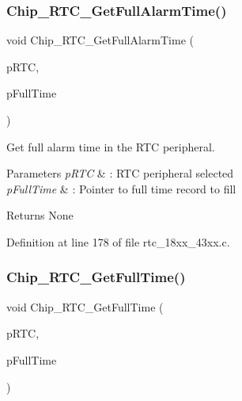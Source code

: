 \subsubsection{\texorpdfstring{Chip\+\_\+\+R\+T\+C\+\_\+\+Get\+Full\+Alarm\+Time()}{Chip\_RTC\_GetFullAlarmTime()}}
{\footnotesize\ttfamily void Chip\+\_\+\+R\+T\+C\+\_\+\+Get\+Full\+Alarm\+Time (\begin{DoxyParamCaption}\item[{\hyperlink{struct_l_p_c___r_t_c___t}{L\+P\+C\+\_\+\+R\+T\+C\+\_\+T} $\ast$}]{p\+R\+TC,  }\item[{\hyperlink{struct_r_t_c___t_i_m_e___t}{R\+T\+C\+\_\+\+T\+I\+M\+E\+\_\+T} $\ast$}]{p\+Full\+Time }\end{DoxyParamCaption})}



Get full alarm time in the R\+TC peripheral. 


\begin{DoxyParams}{Parameters}
{\em p\+R\+TC} & \+: R\+TC peripheral selected \\
\hline
{\em p\+Full\+Time} & \+: Pointer to full time record to fill \\
\hline
\end{DoxyParams}
\begin{DoxyReturn}{Returns}
None 
\end{DoxyReturn}


Definition at line 178 of file rtc\+\_\+18xx\+\_\+43xx.\+c.

\mbox{\label{group___r_t_c__18_x_x__43_x_x_gab03d971e0b77ba907f414cdc00acce3b}} 
\subsubsection{\texorpdfstring{Chip\+\_\+\+R\+T\+C\+\_\+\+Get\+Full\+Time()}{Chip\_RTC\_GetFullTime()}}
{\footnotesize\ttfamily void Chip\+\_\+\+R\+T\+C\+\_\+\+Get\+Full\+Time (\begin{DoxyParamCaption}\item[{\hyperlink{struct_l_p_c___r_t_c___t}{L\+P\+C\+\_\+\+R\+T\+C\+\_\+T} $\ast$}]{p\+R\+TC,  }\item[{\hyperlink{struct_r_t_c___t_i_m_e___t}{R\+T\+C\+\_\+\+T\+I\+M\+E\+\_\+T} $\ast$}]{p\+Full\+Time }\end{DoxyParamCaption})}



